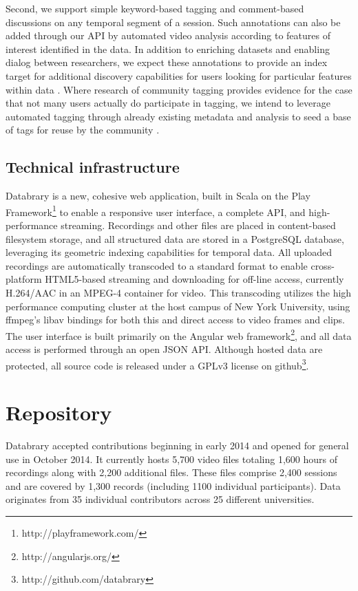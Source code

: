 \documentclass{sig-alternate}
\begin{document}
Second, we support simple keyword-based tagging and comment-based discussions on any temporal segment of a session.
Such annotations can also be added through our API by automated video analysis according to features of interest identified in the data.
In addition to enriching datasets and enabling dialog between researchers, we expect these annotations to provide an index target for additional discovery capabilities for users looking for particular features within data \cite{Lanagan_Smeaton_2012}.
Where research of community tagging provides evidence for the case that not many users actually do participate in tagging, we intend to leverage automated tagging through already existing metadata and analysis to seed a base of tags for reuse by the community \cite{Yang_Lu_Giles_2011, Farooq_etal_2007}.

\subsection{Technical infrastructure}

Databrary is a new, cohesive web application, built in Scala on the Play Framework\footnote{http://playframework.com/} to enable a responsive user interface, a complete API, and high-performance streaming.
Recordings and other files are placed in content-based filesystem storage, and all structured data are stored in a PostgreSQL database, leveraging its geometric indexing capabilities for temporal data.
All uploaded recordings are automatically transcoded to a standard format to enable cross-platform HTML5-based streaming and downloading for off-line access, currently H.264/AAC in an MPEG-4 container for video.
This transcoding utilizes the high performance computing cluster at the host campus of New York University, using ffmpeg's libav bindings for both this and direct access to video frames and clips.
The user interface is built primarily on the Angular web framework\footnote{http://angularjs.org/}, and all data access is performed through an open JSON API.
Although hosted data are protected, all source code is released under a GPLv3 license on github\footnote{http://github.com/databrary}.

\section{Repository}

Databrary accepted contributions beginning in early 2014 and opened for general use in October 2014.
It currently hosts 5,700 video files totaling 1,600 hours of recordings along with 2,200 additional files.
These files comprise 2,400 sessions and are covered by 1,300 records (including 1100 individual participants).
Data originates from 35 individual contributors across 25 different universities.
\end{document}
